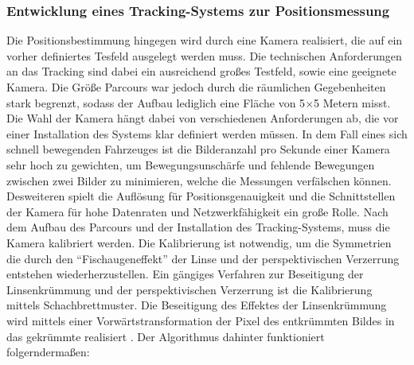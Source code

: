 \subsubsection{Entwicklung eines Tracking-Systems zur Positionsmessung}
Die Positionsbestimmung hingegen wird durch eine Kamera realisiert, die auf ein vorher definiertes Tesfeld ausgelegt werden muss. Die technischen Anforderungen an das Tracking sind dabei ein ausreichend großes Testfeld, sowie eine geeignete Kamera. Die Größe Parcours war jedoch durch die räumlichen Gegebenheiten stark begrenzt, sodass der Aufbau lediglich eine Fläche von 5$\times$5 Metern misst. Die Wahl der Kamera hängt dabei von verschiedenen Anforderungen ab, die vor einer Installation des Systems klar definiert werden müssen. In dem Fall eines sich schnell bewegenden Fahrzeuges ist die Bilderanzahl pro Sekunde einer Kamera sehr hoch zu gewichten, um Bewegungsunschärfe und fehlende Bewegungen zwischen zwei Bilder zu minimieren, welche die Messungen verfälschen können. Desweiteren spielt die Auflösung für Positionsgenauigkeit und die Schnittstellen der Kamera für hohe Datenraten und Netzwerkfähigkeit ein große Rolle. Nach dem Aufbau des Parcours und der Installation des Tracking-Systems, muss die Kamera kalibriert werden. Die Kalibrierung ist notwendig, um die Symmetrien die durch den "`Fischaugeneffekt"' der Linse und der perspektivischen Verzerrung entstehen wiederherzustellen. Ein gängiges Verfahren zur Beseitigung der Linsenkrümmung und der perspektivischen Verzerrung ist die Kalibrierung mittels Schachbrettmuster. Die Beseitigung des Effektes der Linsenkrümmung wird mittels einer Vorwärtstransformation der Pixel des entkrümmten Bildes in das gekrümmte realisiert \cite{Zhang}. Der Algorithmus dahinter funktioniert folgerndermaßen:\par\medskip
